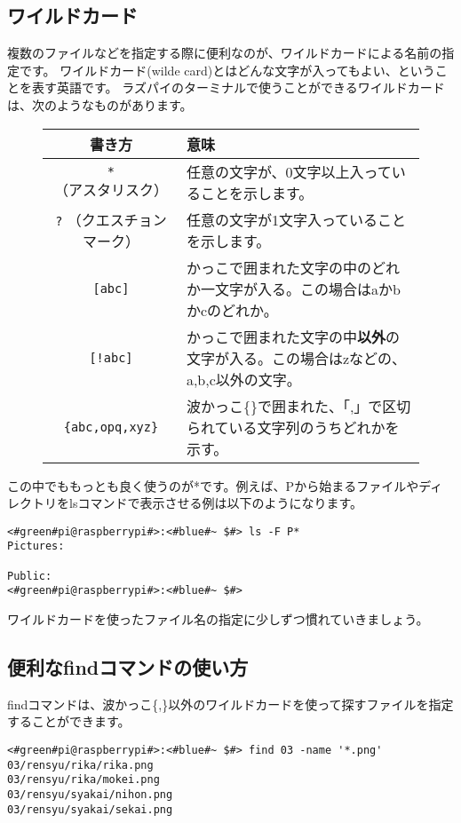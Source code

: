 \subsection{ワイルドカード}
複数のファイルなどを指定する際に便利なのが、ワイルドカードによる名前の指定です。
ワイルドカード(wilde card)とはどんな文字が入ってもよい、ということを表す英語です。
ラズパイのターミナルで使うことができるワイルドカードは、次のようなものがあります。
\newpage %
\begin{figure}[h]
    \begin{tabular}{cp{}} \hline
        書き方 & 意味 \\ \hline
        \texttt{*} （アスタリスク）  & 任意の文字が、0文字以上入っていることを示します。\\
        \texttt{?} （クエスチョンマーク） & 任意の文字が1文字入っていることを示します。\\
        \texttt{[abc]} & かっこで囲まれた文字の中のどれか一文字が入る。この場合はaかbかcのどれか。\\
        \texttt{[!abc]} & かっこで囲まれた文字の中{\bf 以外}の文字が入る。この場合はzなどの、a,b,c以外の文字。\\
        \texttt{\{abc,opq,xyz\}} & 波かっこ\{\}で囲まれた、「,」で区切られている文字列のうちどれかを示す。\\ \hline
    \end{tabular}
\end{figure}

この中でももっとも良く使うのが*です。例えば、Pから始まるファイルやディレクトリをlsコマンドで表示させる例は以下のようになります。
\begin{lstlisting}[caption=ワイルドカードの使い方, label=wildcard]
<#green#pi@raspberrypi#>:<#blue#~ $#> ls -F P*
Pictures:

Public:
<#green#pi@raspberrypi#>:<#blue#~ $#>
\end{lstlisting}

ワイルドカードを使ったファイル名の指定に少しずつ慣れていきましょう。

\subsection{便利なfindコマンドの使い方}
findコマンドは、波かっこ\{,\}以外のワイルドカードを使って探すファイルを指定することができます。

\begin{lstlisting}[caption=03ディレクトリからPNGファイルを探す, label=findwild]
<#green#pi@raspberrypi#>:<#blue#~ $#> find 03 -name '*.png'
03/rensyu/rika/rika.png
03/rensyu/rika/mokei.png
03/rensyu/syakai/nihon.png
03/rensyu/syakai/sekai.png
\end{lstlisting}

